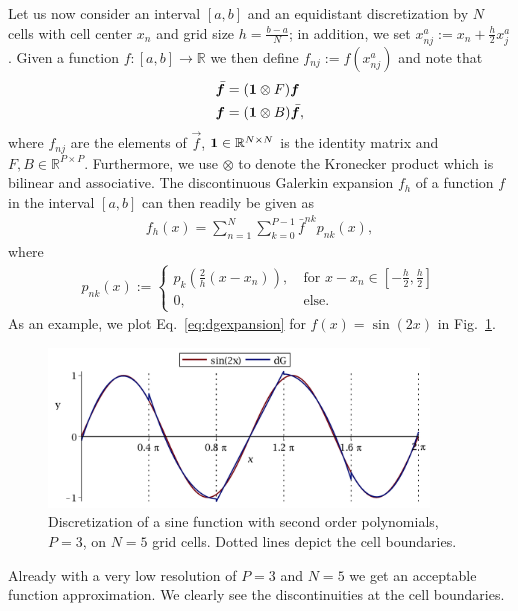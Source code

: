 Let us now consider an interval $[a,b]$ and an equidistant discretization
by $N$ cells with cell center $x_n$ and grid size $h=\frac{b-a}{N}$; in addition, we set $x_{nj}^a := x_n + \frac{h}{2}x^a_j$.
Given a function $f:[a,b]\rightarrow \mathbb{R}$ we then define
$f_{nj} := f(x^a_{nj})$ and note that
\begin{subequations}
\begin{align}
    \bar{ {\boldsymbol{f}}} &= (\mathbf{1}\otimes F) {\boldsymbol{f}} \\
    {\boldsymbol{f}} &= (\mathbf{1}\otimes B) \bar{{\boldsymbol{f}}},
    \label{}
\end{align}
\end{subequations}
where $f_{nj}$ are the elements of $\vec f$,
 $\mathbf{1}\in\mathbb{R}^{N\times N}$ is the identity matrix and $F,B\in\mathbb{R}^{P\times P}$. Furthermore, we use
$\otimes$ to denote the Kronecker product which is bilinear and associative.
The discontinuous Galerkin expansion $f_h$ of a function $f$ in the interval $[a,b]$ can
then readily be given as
\begin{align}
    f_h(x) = \sum_{n=1}^N \sum_{k=0}^{P-1} \bar f^{nk} p_{nk}(x),
    \label{eq:dgexpansion}
\end{align}
where
\begin{align}
    p_{nk}(x) := \begin{cases}
        p_k\left(  \frac{2}{h}(x-x_n)\right),& \ \text{for } x-x_n\in\left[ -\frac{h}{2}, \frac{h}{2} \right]\\
        0,& \ \text{else}.
    \end{cases}
    \label{}
\end{align}
As an example, we plot Eq.~\eqref{eq:dgexpansion} for $f(x)=\sin(2x)$ in Fig.~\ref{fig:discretization}.
\begin{figure}[htpb]
    \includegraphics[width= 0.9\textwidth]{discretization.pdf}
    \caption{ 
    Discretization of a sine function with second order polynomials, $P=3$, 
    on $N=5$ grid cells. Dotted lines depict the cell boundaries. 
    }
    \label{fig:discretization}
\end{figure}
Already with a very low resolution of $P=3$ and $N=5$
we get an acceptable function approximation. We clearly see the discontinuities
at the cell boundaries.

